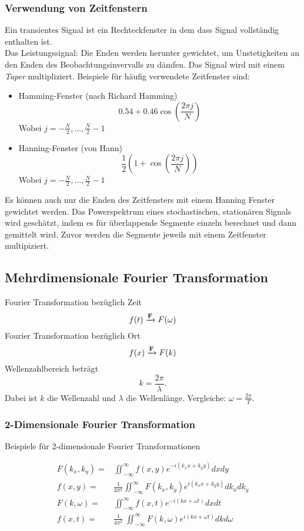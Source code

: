 \subsubsection*{Verwendung von Zeitfenstern}
Ein transientes Signal ist ein Rechteckfenster in dem dass Signal vollständig enthalten ist.\\
Das Leistungssignal: Die Enden werden herunter gewichtet, um Unstetigkeiten an den Enden des Beobachtungsinvervalls zu dämfen. Das Signal wird mit einem \textit{Taper} multipliziert. Beispiele für häufig verwendete Zeitfenster sind:
\begin{itemize}
\item Hamming-Fenster (nach Richard Hamming)
\[
0.54+0.46\cos \left(\frac{2\pi j}{N} \right)
\]
{\small Wobei $j=-\frac{N}{2},\dots, \frac{N}{2}-1$}
\item Hanning-Fenster (von Hann)
\[
\frac{1}{2}\left(1+\cos\left(\frac{2\pi j}{N}\right)\right)
\]
{\small Wobei $j=-\frac{N}{2},\dots, \frac{N}{2}-1$}
\end{itemize}
Es können auch nur die Enden des Zeitfensters mit einem Hanning Fenster gewichtet werden.
Das Powerspektrum eines stochastischen, stationären Signals wird geschätzt, indem es für überlappende Segmente einzeln berechnet und dann gemittelt wird. Zuvor werden die Segmente jeweils mit einem Zeitfenster multipiziert.

\subsection{Mehrdimensionale Fourier Transformation}
Fourier Transformation bezüglich Zeit
\[
f(t) \xrightarrow {\bf F} F(\omega)
\]
Fourier Transformation bezüglich Ort
\[
f(x) \xrightarrow {\bf F} F(k)
\]
Wellenzahlbereich beträgt 
\[
k=\frac{2\pi}{\lambda}.
\]
{\small Dabei ist $k$ die Wellenzahl und $\lambda$ die Wellenlänge.}
Vergleiche: $ \omega =\frac{2\pi}{T}$.

\subsubsection{2-Dimensionale Fourier Transformation}
Beispiele für 2-dimensionale Fourier Transformationen

\begin{align}
F(k_x,k_y) = &\iint_{-\infty}^\infty f(x,y)e^{-i(k_xx+k_yy)} dx dy\\
f(x,y)= &\frac{1}{4\pi^2} \iint_{-\infty}^\infty F(k_x,k_y)e^{i(k_xx+k_yy)} dk_x dk_y\\
F(k,\omega)= & \iint_{-\infty}^\infty f(x,t)e^{-i(kx+\omega t)} dx dt\\
f(x,t)=&\frac{1}{4\pi^2}\ \iint_{-\infty}^\infty F(k,\omega)e^{i(kx+\omega t)} dk d\omega
\end{align}

